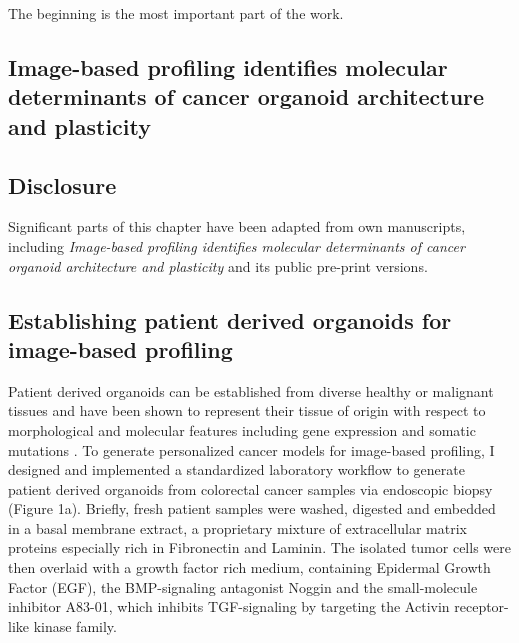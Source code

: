 \begin{savequote}[75mm]
The beginning is the most important part of the work.
\end{savequote}

\begin{flushleft}
\chapter{Image-based profiling identifies molecular determinants of cancer organoid architecture and plasticity}

\newpage

\section{Disclosure}
Significant parts of this chapter have been adapted from own manuscripts, including \textit{Image-based profiling identifies molecular determinants of cancer organoid architecture and plasticity} \cite{Betge2019MultiparametricOrganoids} and its public pre-print versions.

\section{Establishing patient derived organoids for image-based profiling}

Patient derived organoids can be established from diverse healthy or malignant tissues and have been shown to represent their tissue of origin with respect to morphological and molecular features including gene expression and somatic mutations \cite{Fujii:2016jo, Weeber2015-sn, Van_De_Wetering2015-ko, Sato:2011-1h,  Broutier2017-wg}. To generate personalized cancer models for image-based profiling, I designed and implemented a standardized laboratory workflow to generate patient derived organoids from colorectal cancer samples via endoscopic biopsy (Figure 1a). Briefly, fresh patient samples were washed, digested and embedded in a basal membrane extract, a proprietary mixture of extracellular matrix proteins especially rich in Fibronectin and Laminin. The isolated tumor cells were then overlaid with a growth factor rich medium, containing Epidermal Growth Factor (EGF), the BMP-signaling antagonist Noggin and the small-molecule inhibitor A83-01, which inhibits TGF\beta-signaling by targeting the Activin receptor-like kinase family.


\end{flushleft}
